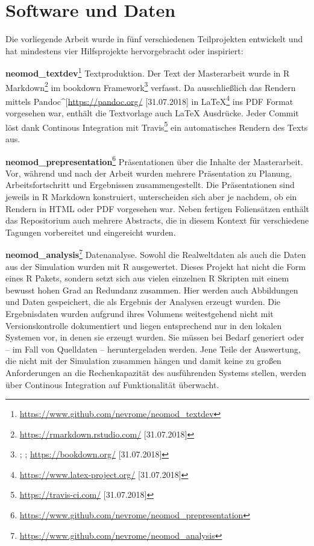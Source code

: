 \documentclass[openany,twoside,twocolumn]{book}
\let\rmarkdownfootnote\footnote%
\def\footnote{\protect\rmarkdownfootnote}
\begin{document}
\hypertarget{software-und-daten}{%
\section{Software und Daten}\label{software-und-daten}}

Die vorliegende Arbeit wurde in fünf verschiedenen Teilprojekten entwickelt und hat mindestens vier Hilfsprojekte hervorgebracht oder inspiriert:

\textbf{neomod\_textdev}\footnote{\url{https://www.github.com/nevrome/neomod_textdev}} \newline 
Textproduktion. Der Text der Masterarbeit wurde in R Markdown\footnote{\url{https://rmarkdown.rstudio.com/} {[}31.07.2018{]}} im bookdown Framework\footnote{\textcite{xie_bookdown_2016}; \textcite{xie_bookdown_2018}; \url{https://bookdown.org/} {[}31.07.2018{]}} verfasst. Da ausschließlich das Rendern mittels Pandoc\^{}{[}\url{https://pandoc.org/} {[}31.07.2018{]} in LaTeX\footnote{\url{https://www.latex-project.org/} {[}31.07.2018{]}} ins PDF Format vorgesehen war, enthält die Textvorlage auch LaTeX Ausdrücke. Jeder Commit löst dank Continous Integration mit Travis\footnote{\url{https://travis-ci.com/} {[}31.07.2018{]}} ein automatisches Rendern des Texts aus.

\textbf{neomod\_prepresentation}\footnote{\url{https://www.github.com/nevrome/neomod_prepresentation}} \newline 
Präsentationen über die Inhalte der Masterarbeit. Vor, während und nach der Arbeit wurden mehrere Präsentation zu Planung, Arbeitsfortschritt und Ergebnissen zusammengestellt. Die Präsentationen sind jeweils in R Markdown konstruiert, unterscheiden sich aber je nachdem, ob ein Rendern in HTML oder PDF vorgesehen war. Neben fertigen Foliensätzen enthält das Repositorium auch mehrere Abstracts, die in diesem Kontext für verschiedene Tagungen vorbereitet und eingereicht wurden.

\textbf{neomod\_analysis}\footnote{\url{https://www.github.com/nevrome/neomod_analysis}} \newline 
Datenanalyse. Sowohl die Realweltdaten als auch die Daten aus der Simulation wurden mit R ausgewertet. Dieses Projekt hat nicht die Form eines R Pakets, sondern setzt sich aus vielen einzelnen R Skripten mit einem bewusst hohen Grad an Redundanz zusammen. Hier werden auch Abbildungen und Daten gespeichert, die als Ergebnis der Analysen erzeugt wurden. Die Ergebnisdaten wurden aufgrund ihres Volumens weitestgehend nicht mit Versionskontrolle dokumentiert und liegen entsprechend nur in den lokalen Systemen vor, in denen sie erzeugt wurden. Sie müssen bei Bedarf generiert oder -- im Fall von Quelldaten -- heruntergeladen werden. Jene Teile der Auswertung, die nicht mit der Simulation zusammen hängen und damit keine zu großen Anforderungen an die Rechenkapazität des ausführenden Systems stellen, werden über Continous Integration auf Funktionalität überwacht.
\end{document}
